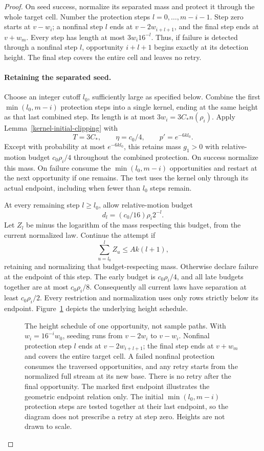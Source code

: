 \begin{proof}
On seed success, normalize its separated mass and protect it through the
whole target cell. Number the protection steps
\(l=0,\ldots,m-i-1\). Step zero starts at \(v-w_i\); a nonfinal
step \(l\) ends at \(v-2w_{i+l+1}\), and the final step ends at
\(v+w_m\). Every step has length at most
\(3w_i16^{-l}\). Thus, if failure is detected through a nonfinal
step \(l\), opportunity \(i+l+1\) begins exactly at its detection
height. The final step covers the entire cell and leaves no retry.


\paragraph{Retaining the separated seed.}
Choose an integer cutoff \(l_0\), sufficiently large as specified below.
Combine the first \(\min(l_0,m-i)\) protection steps into a single
kernel, ending at the same height as that last combined step. Its length
is at most \(3w_i=3C_*n(\rho_i)\).
Apply Lemma~\ref{kernel-initial-clipping} with
\[
 T=3C_*,\qquad \eta=c_0/4,\qquad p'=e^{-6kl_0}.
\]
Except with probability at most \(e^{-6kl_0}\), this retains mass
\(g_1>0\) with relative-motion budget \(c_0\rho_i/4\) throughout
the combined protection. On success normalize this mass. On failure
consume the \(\min(l_0,m-i)\) opportunities and restart at the next
opportunity if one remains. The test uses the kernel only through its
actual endpoint, including when fewer than \(l_0\) steps remain.

At every remaining step \(l\ge l_0\), allow relative-motion budget
\[
 d_l=(c_0/16)\rho_i2^{-l}.
\]
Let \(Z_l\) be minus the logarithm of the mass respecting this budget,
from the current normalized law. Continue the attempt if
\[
 \sum_{u=l_0}^{l}Z_u\le Ak(l+1),
\]
retaining and normalizing that budget-respecting mass. Otherwise declare
failure at the endpoint of this step. The early budget is
\(c_0\rho_i/4\), and all late budgets together are at most
\(c_0\rho_i/8\). Consequently all current laws have separation at
least \(c_0\rho_i/2\). Every restriction and normalization uses
only rows strictly below its endpoint.
Figure~\ref{fig:nested-opportunities} depicts the underlying height schedule.

\begin{figure}[tbp]
\centering

\caption{The height schedule of one opportunity, not sample paths.
With $w_i=16^{-i}w_0$, seeding runs from $v-2w_i$ to $v-w_i$.
Nonfinal protection step $l$ ends at $v-2w_{i+l+1}$;
the final step ends at $v+w_m$ and covers the entire target cell.
A failed nonfinal protection consumes the traversed opportunities,
and any retry starts from the normalized full stream at its new base.
There is no retry after the final opportunity. The marked first
endpoint illustrates the geometric endpoint relation only. The initial
$\min(l_0,m-i)$ protection steps are tested together at their last
endpoint, so the diagram does not prescribe a retry at step zero.
Heights are not drawn to scale.}
\label{fig:nested-opportunities}
\end{figure}


\end{proof}
